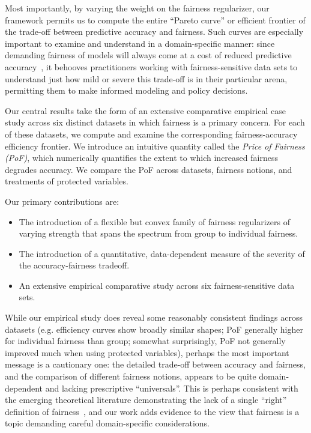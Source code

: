 Most importantly, by varying the weight on the fairness regularizer,
our framework permits us to compute the entire ``Pareto curve'' or
efficient frontier of the trade-off between predictive accuracy and
fairness. Such curves are especially important to examine and
understand in a domain-specific manner: since demanding fairness of
models will always come at a cost of reduced predictive
accuracy~\cite{Corbett-DaviesP17, FishKL16, ZafarVGG17, jelveh2015},
it behooves practitioners working with fairness-sensitive data sets to
understand just how mild or severe this trade-off is in their
particular arena, permitting them to make informed modeling and policy
decisions.

Our central results take the form of an extensive comparative
empirical case study across six distinct datasets in which fairness is
a primary concern. For each of these datasets, we compute and examine
the corresponding fairness-accuracy efficiency frontier. We introduce
an intuitive quantity called the {\em Price of Fairness (PoF)\/},
which numerically quantifies the extent to which increased fairness
degrades accuracy. We compare the PoF across datasets, fairness
notions, and treatments of protected variables.

Our primary contributions are:
\begin{itemize}
\item The introduction of a flexible but convex family of fairness
  regularizers of varying strength that spans the spectrum from group
  to individual fairness.
\item The introduction of a quantitative, data-dependent measure of
  the severity of the accuracy-fairness tradeoff.
\item An extensive empirical comparative study across six
  fairness-sensitive data sets.
\end{itemize}

While our empirical study does reveal some reasonably consistent
findings across datasets (e.g. efficiency curves show broadly similar
shapes; PoF generally higher for individual fairness than group;
somewhat surprisingly, PoF not generally improved much when using
protected variables), perhaps the most important message is a
cautionary one: the detailed trade-off between accuracy and fairness,
and the comparison of different fairness notions, appears to be quite
domain-dependent and lacking prescriptive ``universals''. This is
perhaps consistent with the emerging theoretical literature
demonstrating the lack of a single ``right'' definition of
fairness~\cite{KleinbergMR16,Chouldechova17,FriedlerSV16}, and our
work adds evidence to the view that fairness is a topic demanding
careful domain-specific considerations.
